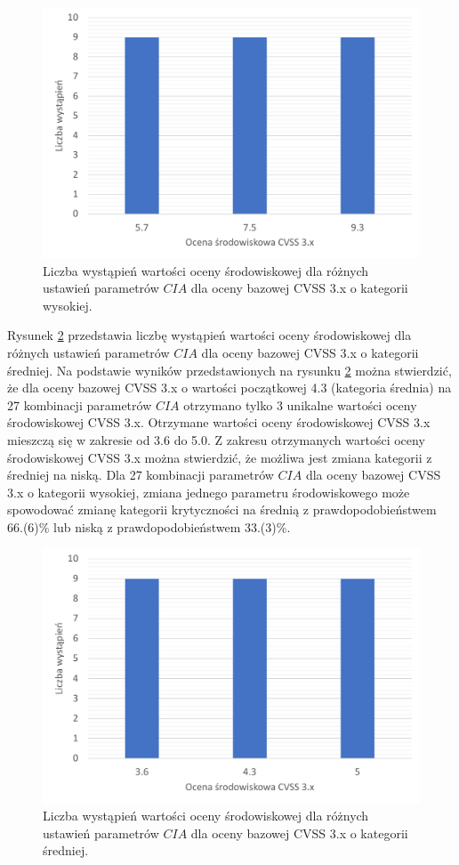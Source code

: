\begin{figure}[!ht]
\centering
\includegraphics[width=.9\textwidth]{Chapters/Wplyw/cvss3/cvss_3_high.pdf}
\caption{Liczba wystąpień wartości oceny środowiskowej dla różnych ustawień parametrów $CIA$ dla oceny bazowej CVSS 3.x o kategorii wysokiej.}
\label{fig:wplyw:env_a:cvss_3_high}
\end{figure}

\bigbreak
Rysunek \ref{fig:wplyw:env_a:cvss_3_medium} przedstawia liczbę wystąpień wartości oceny środowiskowej dla różnych ustawień parametrów $CIA$ dla oceny bazowej CVSS 3.x o kategorii średniej. Na podstawie wyników przedstawionych na rysunku \ref{fig:wplyw:env_a:cvss_3_medium} można stwierdzić, że dla oceny bazowej CVSS 3.x o wartości początkowej 4.3 (kategoria średnia) na 27 kombinacji parametrów $CIA$ otrzymano tylko 3 unikalne wartości oceny środowiskowej CVSS 3.x. Otrzymane wartości oceny środowiskowej CVSS 3.x mieszczą się w zakresie od 3.6 do 5.0. Z zakresu otrzymanych wartości oceny środowiskowej CVSS 3.x można stwierdzić, że możliwa jest zmiana kategorii z średniej na niską. Dla 27 kombinacji parametrów $CIA$ dla oceny bazowej CVSS 3.x o kategorii wysokiej, zmiana jednego parametru środowiskowego może spowodować zmianę kategorii krytyczności na średnią z prawdopodobieństwem 66.(6)\% lub niską z prawdopodobieństwem 33.(3)\%.

\begin{figure}[!ht]
\centering
\includegraphics[width=.9\textwidth]{Chapters/Wplyw/cvss3/cvss_3_medium.pdf}
\caption{Liczba wystąpień wartości oceny środowiskowej dla różnych ustawień parametrów $CIA$ dla oceny bazowej CVSS 3.x o kategorii średniej.}
\label{fig:wplyw:env_a:cvss_3_medium}
\end{figure}


